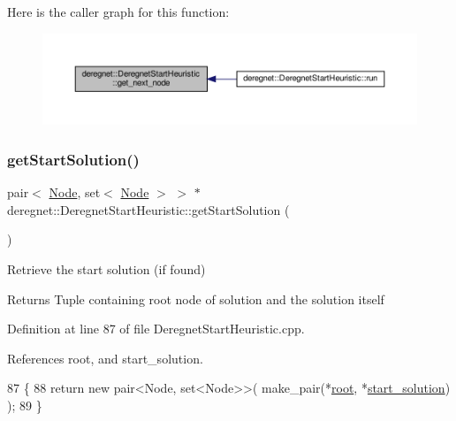 Here is the caller graph for this function\+:\nopagebreak
\begin{figure}[H]
\begin{center}
\leavevmode
\includegraphics[width=350pt]{classderegnet_1_1DeregnetStartHeuristic_a6ec478444151e54625951f858ff76761_icgraph}
\end{center}
\end{figure}
\mbox{\label{classderegnet_1_1DeregnetStartHeuristic_aacc20eaced32a65e78fcc18e56f966cc}} 
\subsubsection{\texorpdfstring{get\+Start\+Solution()}{getStartSolution()}}
{\footnotesize\ttfamily pair$<$ \hyperlink{namespacederegnet_a744bad34f2de9856d36715a445f027f3}{Node}, set$<$ \hyperlink{namespacederegnet_a744bad34f2de9856d36715a445f027f3}{Node} $>$ $>$ $\ast$ deregnet\+::\+Deregnet\+Start\+Heuristic\+::get\+Start\+Solution (\begin{DoxyParamCaption}{ }\end{DoxyParamCaption})}



Retrieve the start solution (if found) 

\begin{DoxyReturn}{Returns}
Tuple containing root node of solution and the solution itself 
\end{DoxyReturn}


Definition at line 87 of file Deregnet\+Start\+Heuristic.\+cpp.



References root, and start\+\_\+solution.


\begin{DoxyCode}
87                                                                 \{
88     \textcolor{keywordflow}{return} \textcolor{keyword}{new} pair<Node, set<Node>>( make\_pair(*\hyperlink{classderegnet_1_1DeregnetStartHeuristic_a4605d41352e3adf1f9f9f32466a4e61e}{root}, *\hyperlink{classderegnet_1_1DeregnetStartHeuristic_a7450e11ca0a265b055f95e7832b65e2f}{start\_solution}) );
89 \}
\end{DoxyCode}
\mbox{\label{classderegnet_1_1DeregnetStartHeuristic_aa2afcafa3d3838a7e7b05faf586954e8}} 
